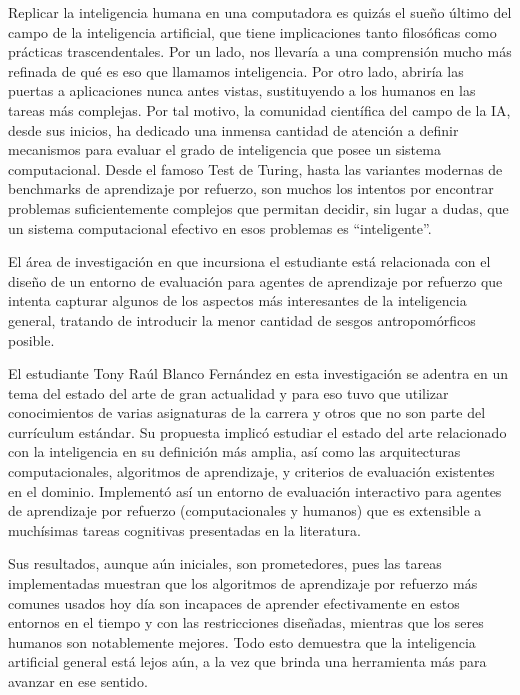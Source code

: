 \begin{opinion}
Replicar la inteligencia humana en una computadora es quizás el sueño último del campo de la inteligencia artificial, que tiene implicaciones tanto filosóficas como prácticas trascendentales. Por un lado, nos llevaría a una comprensión mucho más refinada de qué es eso que llamamos inteligencia. Por otro lado, abriría las puertas a aplicaciones nunca antes vistas, sustituyendo a los humanos en las tareas más complejas. Por tal motivo, la comunidad científica del campo de la IA, desde sus inicios, ha dedicado una inmensa cantidad de atención a definir mecanismos para evaluar el grado de inteligencia que posee un sistema computacional. Desde el famoso Test de Turing, hasta las variantes modernas de benchmarks de aprendizaje por refuerzo, son muchos los intentos por encontrar problemas suficientemente complejos que permitan decidir, sin lugar a dudas, que un sistema computacional efectivo en esos problemas es ``inteligente''.

El área de investigación en que incursiona el estudiante está relacionada con el diseño de un entorno de evaluación para agentes de aprendizaje por refuerzo que intenta capturar algunos de los aspectos más interesantes de la inteligencia general, tratando de introducir la menor cantidad de sesgos antropomórficos posible.

El  estudiante Tony Raúl Blanco Fernández en esta investigación se adentra en un tema del estado del arte de gran actualidad y para eso tuvo que utilizar conocimientos de varias asignaturas de la carrera y otros que no son parte del currículum estándar. Su propuesta implicó estudiar el estado del arte relacionado con la inteligencia en su definición más amplia, así como las arquitecturas computacionales, algoritmos de aprendizaje, y criterios de evaluación existentes en el dominio. Implementó así un entorno de evaluación interactivo para agentes de aprendizaje por refuerzo (computacionales y humanos) que es extensible a muchísimas tareas cognitivas presentadas en la literatura.

Sus resultados, aunque aún iniciales, son prometedores, pues las tareas implementadas muestran que los algoritmos de aprendizaje por refuerzo más comunes usados hoy día son incapaces de aprender efectivamente en estos entornos en el tiempo y con las restricciones diseñadas, mientras que los seres humanos son notablemente mejores. Todo esto demuestra que la inteligencia artificial general está lejos aún, a la vez que brinda una herramienta más para avanzar en ese sentido.


\end{opinion}
